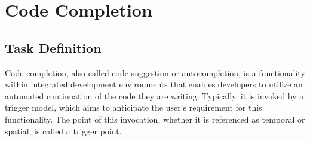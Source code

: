 \chapter{Code Completion}






\section{Task Definition}

Code completion, also called code suggestion or autocompletion, is a functionality within integrated development environments that enables developers to utilize an automated continuation of the code they are writing. Typically, it is invoked by a trigger model, which aims to anticipate the user's requirement for this functionality. The point of this invocation, whether it is referenced as temporal or spatial, is called a trigger point.

